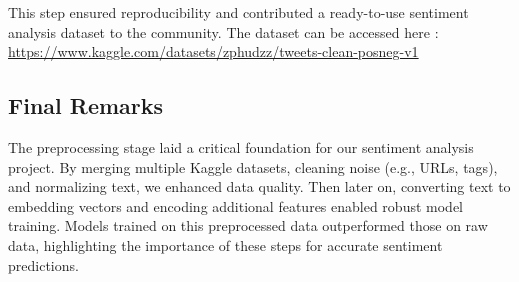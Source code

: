 This step ensured reproducibility and contributed a ready-to-use sentiment analysis dataset to the community. The dataset can be accessed here : \url{https://www.kaggle.com/datasets/zphudzz/tweets-clean-posneg-v1}

\subsection{Final Remarks}

The preprocessing stage laid a critical foundation for our sentiment analysis project. By merging multiple Kaggle datasets, cleaning noise (e.g., URLs, tags), and normalizing text, we enhanced data quality. Then later on, converting text to embedding vectors and encoding additional features enabled robust model training. Models trained on this preprocessed data outperformed those on raw data, highlighting the importance of these steps for accurate sentiment predictions.

\newpage
